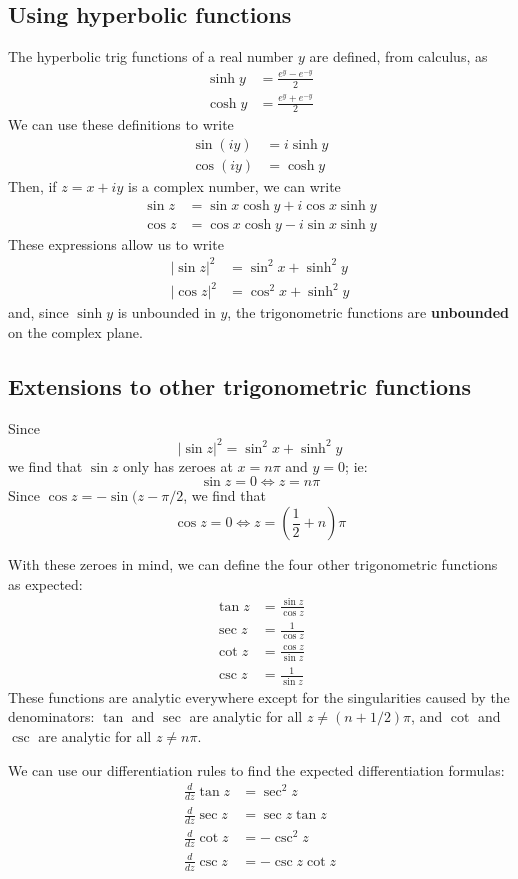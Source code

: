 \documentclass{article}
\renewcommand{\emph}{\textbf}
\begin{document}
\subsection{Using hyperbolic functions}
The hyperbolic trig functions of a real number $y$ are defined, from calculus, as
\begin{align*}
	\sinh y &= \frac{e^y - e^{-y}}{2} \\
	\cosh y &= \frac{e^y + e^{-y}}{2}
\end{align*}
We can use these definitions to write
\begin{align*}
	\sin(iy) &= i \sinh y \\
	\cos(iy) &=   \cosh y
\end{align*}
Then, if $z = x + iy$ is a complex number, we can write
\begin{align*}
	\sin z &= \sin x \cosh y + i \cos x \sinh y \\
	\cos z &= \cos x \cosh y - i \sin x \sinh y
\end{align*}
These expressions allow us to write
\begin{align*}
	|\sin z|^2 &= \sin^2 x + \sinh^2 y \\
	|\cos z|^2 &= \cos^2 x + \sinh^2 y
\end{align*}
and, since $\sinh y$ is unbounded in $y$, the trigonometric functions are \emph{unbounded} on the complex plane.

\subsection{Extensions to other trigonometric functions}
Since
\[
	|\sin z|^2 = \sin^2 x + \sinh^2 y
\]
we find that $\sin z$ only has zeroes at $x = n \pi$ and $y = 0$; ie:
\[
	\sin z = 0 \iff z = n\pi
\]
Since $\cos z = -\sin(z - \pi/2$, we find that 
\[
	\cos z = 0 \iff z = \left( \frac{1}{2} + n \right) \pi
\]

With these zeroes in mind, we can define the four other trigonometric functions as expected:
\begin{align*}
	\tan z &= \frac{\sin z}{\cos z} \\
	\sec z &= \frac{1}{\cos z} \\
	\cot z &= \frac{\cos z}{\sin z} \\
	\csc z &= \frac{1}{\sin z}
\end{align*}
These functions are analytic everywhere except for the singularities caused by the denominators: $\tan$ and $\sec$ are analytic for all $z \neq (n + 1/2)\pi$, and $\cot$ and $\csc$ are analytic for all $z \neq n\pi$. 

We can use our differentiation rules to find the expected differentiation formulas:
\begin{align*}
	\frac{d}{dz} \tan z &= \sec^2 z \\
	\frac{d}{dz} \sec z &= \sec z \tan z \\
	\frac{d}{dz} \cot z &= -\csc^2 z \\
	\frac{d}{dz} \csc z &= -\csc z \cot z
\end{align*}
\end{document}
